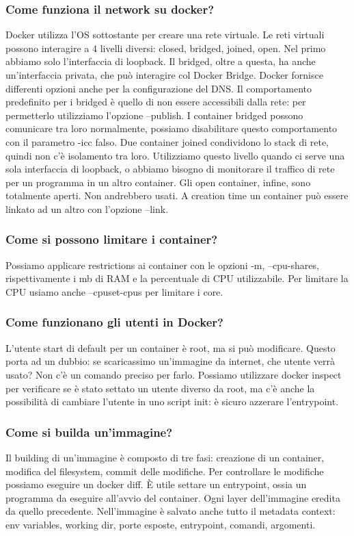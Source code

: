\documentclass[11pt]{article}
\begin{document}
\subsubsection{Come funziona il network su docker?}
Docker utilizza l'OS sottostante per creare una rete virtuale. Le reti virtuali possono interagire a 4 livelli diversi: closed, bridged, joined, open. Nel primo abbiamo solo l'interfaccia di loopback. Il bridged, oltre a questa, ha anche un'interfaccia privata, che può interagire col Docker Bridge. Docker fornisce differenti opzioni anche per la configurazione del DNS. Il comportamento predefinito per i bridged è quello di non essere accessibili dalla rete: per permetterlo utilizziamo l'opzione --publish. I container bridged possono comunicare tra loro normalmente, possiamo disabilitare questo comportamento con il parametro -icc falso. Due container joined condividono lo stack di rete, quindi non c'è isolamento tra loro. Utilizziamo questo livello quando ci serve una sola interfaccia di loopback, o abbiamo bisogno di monitorare il traffico di rete per un programma in un altro container. Gli open container, infine, sono totalmente aperti. Non andrebbero usati. A creation time un container può essere linkato ad un altro con l'opzione --link.

\subsubsection{Come si possono limitare i container?}
Possiamo applicare restrictions ai container con le opzioni -m, --cpu-shares, rispettivamente i mb di RAM e la percentuale di CPU utilizzabile. Per limitare la CPU usiamo anche --cpuset-cpus per limitare i core.

\subsubsection{Come funzionano gli utenti in Docker?}
L'utente start di default per un container è root, ma si può modificare. Questo porta ad un dubbio: se scaricassimo un'immagine da internet, che utente verrà usato? Non c'è un comando preciso per farlo. Possiamo utilizzare docker inspect per verificare se è stato settato un utente diverso da root, ma c'è anche la possibilità di cambiare l'utente in uno script init: è sicuro azzerare l'entrypoint. 

\subsubsection{Come si builda un'immagine?}
Il building di un'immagine è composto di tre fasi: creazione di un container, modifica del filesystem, commit delle modifiche. Per controllare le modifiche possiamo eseguire un docker diff. È utile settare un entrypoint, ossia un programma da eseguire all'avvio del container. Ogni layer dell'immagine eredita da quello precedente. Nell'immagine è salvato anche tutto il metadata context: env variables, working dir, porte esposte, entrypoint, comandi, argomenti. 
\end{document}
